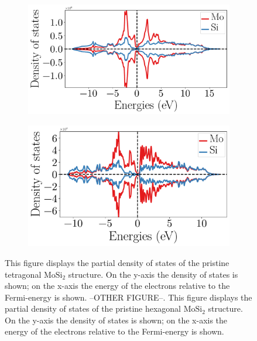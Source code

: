 \documentclass[12pt]{article}
\theoremstyle{plain}
\theoremstyle{definition}
\newcommand{\<}{\langle}
\renewcommand{\>}{\rangle}
\begin{document}
\begin{figure}[b!]
\centering
\begin{subfigure}{.5\textwidth}
  \centering
\includegraphics[width=\linewidth]{img/partial_dos_MoSi2_tetragonal.pdf}
  \caption{}
\label{fig:DOS-mosi2-hexagonal}
\end{subfigure}%
\begin{subfigure}{.46\textwidth}
  \centering
\includegraphics[width=\linewidth]{img/partial_dos_MoSi2_hexagonal.pdf}
  \caption{}
\label{fig:DOS-mosi2-tetragonal}
\end{subfigure}
\caption{This figure displays the partial density of states of the pristine tetragonal $\text{Mo}\text{Si}_2$ structure. On the y-axis the density of states is shown; on the x-axis the energy of the electrons relative to the Fermi-energy is shown. --OTHER FIGURE--. This figure displays the partial density of states of the pristine hexagonal $\text{Mo}\text{Si}_2$ structure. On the y-axis the density of states is shown; on the x-axis the energy of the electrons relative to the Fermi-energy is shown.}
\end{figure}
\end{document}
